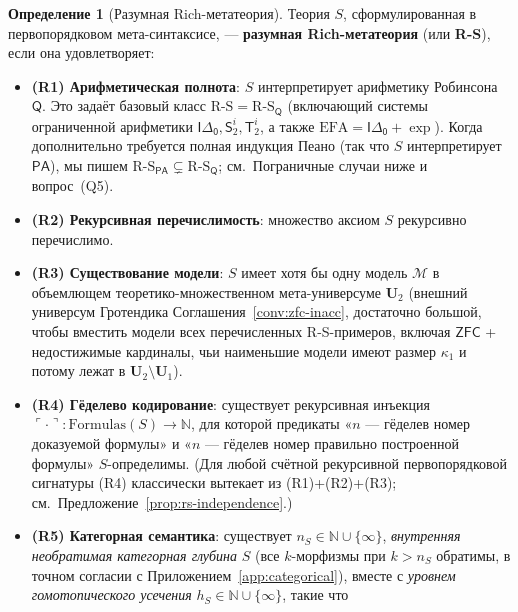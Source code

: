 \documentclass[11pt]{article}
\theoremstyle{plain}
\theoremstyle{definition}
\newtheorem{definition}[theorem]{Определение}
\newcommand{\RS}{\mathrm{R\text{-}S}}
\newcommand{\cM}{\mathcal{M}}
\newcommand{\PA}{\mathsf{PA}}
\newcommand{\ZFC}{\mathsf{ZFC}}
\begin{document}
\begin{definition}[Разумная Rich-метатеория]\label{def:rs}
Теория $S$, сформулированная в первопорядковом мета-синтаксисе, — \textbf{разумная Rich-метатеория} (или \textbf{R-S}), если она удовлетворяет:
\begin{itemize}
\item \textbf{(R1) Арифметическая полнота}: $S$ интерпретирует арифметику Робинсона $\mathsf{Q}$. Это задаёт базовый класс $\RS = \RS_{\mathsf{Q}}$ (включающий системы ограниченной арифметики $\mathsf{I\Delta_0}, \mathsf{S}_2^i, \mathsf{T}_2^i$, а также $\mathrm{EFA} = \mathsf{I\Delta_0} + \exp$). Когда дополнительно требуется полная индукция Пеано (так что $S$ интерпретирует $\PA$), мы пишем $\RS_{\PA} \subsetneq \RS_{\mathsf{Q}}$; см.\ Пограничные случаи ниже и вопрос~(Q5).
\item \textbf{(R2) Рекурсивная перечислимость}: множество аксиом $S$ рекурсивно перечислимо.
\item \textbf{(R3) Существование модели}: $S$ имеет хотя бы одну модель $\cM$ в объемлющем теоретико-множественном мета-универсуме $\mathbf{U}_2$ (внешний универсум Гротендика Соглашения~\ref{conv:zfc-inacc}, достаточно большой, чтобы вместить модели всех перечисленных R-S-примеров, включая $\ZFC$ + недостижимые кардиналы, чьи наименьшие модели имеют размер $\kappa_1$ и потому лежат в $\mathbf{U}_2 \setminus \mathbf{U}_1$).
\item \textbf{(R4) Гёделево кодирование}: существует рекурсивная инъекция $\ulcorner \cdot \urcorner : \mathrm{Formulas}(S) \to \mathbb{N}$, для которой предикаты «$n$ — гёделев номер доказуемой формулы» и «$n$ — гёделев номер правильно построенной формулы» $S$-определимы. (Для любой счётной рекурсивной первопорядковой сигнатуры (R4) классически вытекает из (R1)+(R2)+(R3); см.\ Предложение~\ref{prop:rs-independence}.)
\item \textbf{(R5) Категорная семантика}: существует $n_S \in \mathbb{N} \cup \{\infty\}$, \emph{внутренняя необратимая категорная глубина} $S$ (все $k$-морфизмы при $k > n_S$ обратимы, в точном согласии с Приложением~\ref{app:categorical}), вместе с \emph{уровнем гомотопического усечения} $h_S \in \mathbb{N} \cup \{\infty\}$, такие что
\begin{itemize}

\end{itemize}
\end{itemize}
\end{definition}
\end{document}
